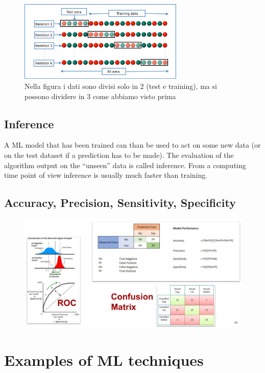 \begin{figure}[ht]
	\centering
	\includegraphics[width=0.7\textwidth]{figure_ml/k-folding.png}
	\caption{Nella figura i dati sono divisi solo in 2 (test e training), ma si possono dividere in 3 come abbiamo visto prima}
\end{figure}
\FloatBarrier

\subsection{Inference}

A ML model that has been trained can than be used to act on some new data (or on the test dataset if a prediction has to be made).
The evaluation of the algorithm output on the “unseen” data is called inference. From a computing time point of view inference is usually much faster than training.

\subsection{Accuracy, Precision, Sensitivity, Specificity}

\begin{figure}[ht]
	\centering
	\includegraphics[width=1\textwidth]{figure_ml/apss.png}
\end{figure}
\FloatBarrier


\section{Examples of ML techniques}

